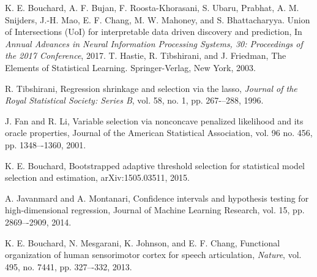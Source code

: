 \documentclass[letterpaper, 10 pt, conference]{ieeeconf}  %
\begin{document}
\begin{thebibliography}{99}

 K. E. Bouchard, A. F. Bujan, F. Roosta-Khorasani, S. Ubaru, Prabhat, A. M. Snijders, J.-H. Mao, E. F. Chang, M. W. Mahoney, and S. Bhattacharyya. Union of Intersections (UoI) for interpretable data driven discovery and prediction, In \textit{Annual Advances in Neural Information Processing Systems, 30: Proceedings of the 2017 Conference}, 2017.
 T. Hastie, R. Tibshirani, and J. Friedman, The Elements of Statistical Learning. Springer-Verlag, New York, 2003.

 R. Tibshirani, Regression shrinkage and selection via the lasso, \textit{Journal of the Royal Statistical Society: Series B}, vol. 58, no. 1, pp. 267-–288, 1996.

 J. Fan and R. Li, Variable selection via nonconcave penalized likelihood and its oracle properties, Journal of the American Statistical Association, vol. 96 no. 456, pp. 1348–-1360, 2001.

 K. E. Bouchard, Bootstrapped adaptive threshold selection for statistical model selection and estimation, arXiv:1505.03511, 2015.

 A. Javanmard and A. Montanari, Confidence intervals and hypothesis testing for high-dimensional regression, Journal of Machine Learning Research, vol. 15, pp. 2869–-2909, 2014.


 K. E. Bouchard, N. Mesgarani, K. Johnson, and E. F. Chang, Functional organization of human sensorimotor cortex for speech articulation, \textit{Nature}, vol. 495, no. 7441, pp. 327–-332, 2013.






\end{thebibliography}
\end{document}
